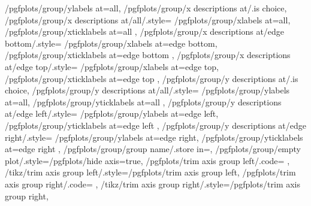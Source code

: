 {    /pgfplots/group/ylabels at=all,
    /pgfplots/group/x descriptions at/.is choice,
    /pgfplots/group/x descriptions at/all/.style={
        /pgfplots/group/xlabels at=all,
        /pgfplots/group/xticklabels at=all
    },
    /pgfplots/group/x descriptions at/edge bottom/.style={
        /pgfplots/group/xlabels at=edge bottom,
        /pgfplots/group/xticklabels at=edge bottom
    },
    /pgfplots/group/x descriptions at/edge top/.style={
        /pgfplots/group/xlabels at=edge top,
        /pgfplots/group/xticklabels at=edge top
    },
    /pgfplots/group/y descriptions at/.is choice,
    /pgfplots/group/y descriptions at/all/.style={
        /pgfplots/group/ylabels at=all,
        /pgfplots/group/yticklabels at=all
    },
    /pgfplots/group/y descriptions at/edge left/.style={
        /pgfplots/group/ylabels at=edge left,
        /pgfplots/group/yticklabels at=edge left
    },
    /pgfplots/group/y descriptions at/edge right/.style={
        /pgfplots/group/ylabels at=edge right,
	/pgfplots/group/yticklabels at=edge right
    },
    /pgfplots/group/group name/.store in=\pgfplots@group@name,
    /pgfplots/group/empty plot/.style={/pgfplots/hide axis=true},
	/pgfplots/trim axis group left/.code={%
	},%
	/tikz/trim axis group left/.style={/pgfplots/trim axis group left},
	/pgfplots/trim axis group right/.code={%
	},%
	/tikz/trim axis group right/.style={/pgfplots/trim axis group right},
}

\def\nextgroupplot{%
    \pgfutil@ifnextchar[{\pgfplots@group@nextplot}{\pgfplots@group@nextplot[]}%
}

